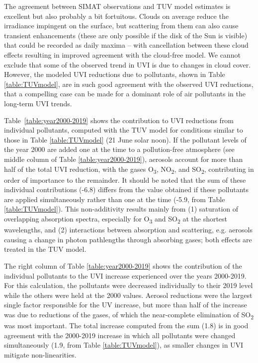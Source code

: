 \documentclass[journal=jacsat,manuscript=article]{achemso}
\begin{document}
The agreement between SIMAT observations and TUV model estimates is
excellent but also probably a bit fortuitous. Clouds on average reduce
the irradiance impingent on the surface, but scattering from them can
also cause transient enhancements (these are only possible if the disk of the Sun is visible)
that could be recorded as daily maxima -- with cancellation
between these cloud effects resulting in improved agreement with the
cloud-free model. We cannot exclude that some of the observed trend in
UVI is due to changes in cloud cover. However, the modeled
UVI reductions due to pollutants, shown in Table
  {\ref{table:TUVmodel}}, are in such good agreement with
the observed UVI reductions, that a compelling case can be made for a
dominant role of air pollutants in the long-term UVI trends.

Table~{\ref{table:year2000-2019}} shows the contribution to UVI reductions from individual pollutants,
computed with the TUV model for conditions similar to those in Table {\ref{table:TUVmodel}} (21 June solar noon).
If the pollutant levels of the year 2000 are added one at the time to a pollution-free atmosphere
(see middle column of Table {\ref{table:year2000-2019}}),
aerosols account for more than half of the total UVI reduction,
with the gases O\textsubscript{3}, NO\textsubscript{2}, and SO\textsubscript{2},
contributing in order of importance to the remainder. It should be noted that the sum
of these individual contributions (-6.8) differs from the value obtained if these pollutants
are applied simultaneously rather than one at the time (-5.9, from Table {\ref{table:TUVmodel}}).
This non-additivity results mainly from (1) saturation of overlapping absorption spectra,
especially for O\textsubscript{3} and SO\textsubscript{2} at the shortest wavelengths, and (2)
interactions between absorption and scattering, e.g. aerosols causing a change in photon
pathlengths through absorbing gases; both effects are treated in the TUV model.

The right column of Table {\ref{table:year2000-2019}} shows the contribution of the individual pollutants to the UVI
increase experienced over the years 2000-2019. For this calculation, the pollutants
were decreased individually to their 2019 level while the others were held at the 2000 values.
Aerosol reductions were the largest single factor responsible for the UV increase,
but more than half of the increase was due to reductions of the gases, of which the near-complete
elimination of SO\textsubscript{2} was most important. The total increase computed from the sum (1.8) is in
good agreement with the 2000-2019 increase in which all pollutants were changed simultaneously
(1.9, from Table {\ref{table:TUVmodel}}), as smaller changes in UVI mitigate non-linearities.
\end{document}
